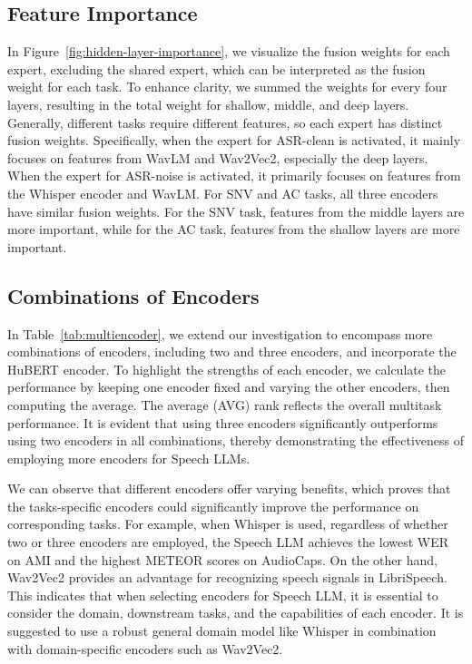 \subsection{Feature Importance}

In Figure~\ref{fig:hidden-layer-importance}, we visualize the fusion weights for each expert, excluding the shared expert, which can be interpreted as the fusion weight for each task. To enhance clarity, we summed the weights for every four layers, resulting in the total weight for shallow, middle, and deep layers. Generally, different tasks require different features, so each expert has distinct fusion weights. Specifically, when the expert for ASR-clean is activated, it mainly focuses on features from WavLM and Wav2Vec2, especially the deep layers. When the expert for ASR-noise is activated, it primarily focuses on features from the Whisper encoder and WavLM. For SNV and AC tasks, all three encoders have similar fusion weights. For the SNV task, features from the middle layers are more important, while for the AC task, features from the shallow layers are more important.

\subsection{Combinations of Encoders}

In Table~\ref{tab:multiencoder}, we extend our investigation to encompass more combinations of encoders, including two and three encoders, and incorporate the HuBERT encoder. To highlight the strengths of each encoder, we calculate the performance by keeping one encoder fixed and varying the other encoders, then computing the average. The average (AVG) rank reflects the overall multitask performance. It is evident that using three encoders significantly outperforms using two encoders in all combinations, thereby demonstrating the effectiveness of employing more encoders for Speech LLMs.
 
We can observe that different encoders offer varying benefits, which proves that the tasks-specific encoders could significantly improve the performance on corresponding tasks. For example, when Whisper is used, regardless of whether two or three encoders are employed, the Speech LLM achieves the lowest WER on AMI and the highest METEOR scores on AudioCaps. On the other hand, Wav2Vec2 provides an advantage for recognizing speech signals in LibriSpeech. This indicates that when selecting encoders for Speech LLM, it is essential to consider the domain, downstream tasks, and the capabilities of each encoder. It is suggested to use a robust general domain model like Whisper in combination with domain-specific encoders such as Wav2Vec2.

